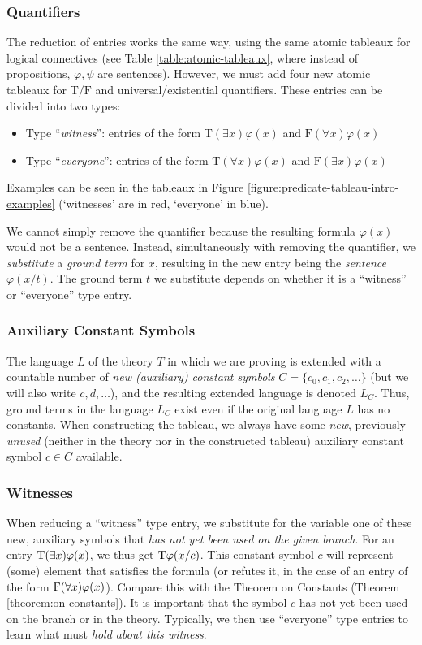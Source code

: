 \subsubsection{Quantifiers}
The reduction of entries works the same way, using the same atomic tableaux for logical connectives (see Table \ref{table:atomic-tableaux}, where instead of propositions, $\varphi,\psi$ are sentences). However, we must add four new atomic tableaux for $\mathrm T/\mathrm F$ and universal/existential quantifiers. These entries can be divided into two types:
\begin{itemize}
    \item Type ``\emph{witness}'': entries of the form $\mathrm{T}(\exists x)\varphi(x)$ and $\mathrm{F}(\forall x)\varphi(x)$
    \item Type ``\emph{everyone}'': entries of the form $\mathrm{T}(\forall x)\varphi(x)$ and $\mathrm{F}(\exists x)\varphi(x)$    
\end{itemize}
Examples can be seen in the tableaux in Figure \ref{figure:predicate-tableau-intro-examples} (`witnesses' are in red, `everyone' in blue).

We cannot simply remove the quantifier because the resulting formula $\varphi(x)$ would not be a sentence. Instead, simultaneously with removing the quantifier, we \emph{substitute} a \emph{ground term} for $x$, resulting in the new entry being the \emph{sentence} $\varphi(x/t)$. The ground term $t$ we substitute depends on whether it is a ``witness'' or ``everyone'' type entry.

\subsubsection{Auxiliary Constant Symbols}
The language $L$ of the theory $T$ in which we are proving is extended with a countable number of \emph{new (auxiliary) constant symbols} $C=\{c_0,c_1,c_2,\dots\}$ (but we will also write $c,d,\dots$), and the resulting extended language is denoted $L_C$. Thus, ground terms in the language $L_C$ exist even if the original language $L$ has no constants. When constructing the tableau, we always have some \emph{new}, previously \emph{unused} (neither in the theory nor in the constructed tableau) auxiliary constant symbol $c\in C$ available.

\subsubsection{Witnesses}
When reducing a ``witness'' type entry, we substitute for the variable one of these new, auxiliary symbols that \emph{has not yet been used on the given branch}. For an entry $\mathrm{T}(\exists x)\varphi(x)$, we thus get $\mathrm{T}\varphi(x/c)$. This constant symbol $c$ will represent (some) element that satisfies the formula (or refutes it, in the case of an entry of the form $\mathrm{F}(\forall x)\varphi(x)$). Compare this with the Theorem on Constants (Theorem \ref{theorem:on-constants}). It is important that the symbol $c$ has not yet been used on the branch or in the theory. Typically, we then use ``everyone'' type entries to learn what must \emph{hold about this witness}.

